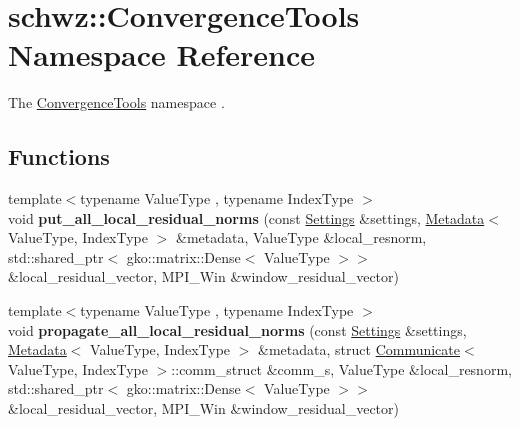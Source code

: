 \hypertarget{namespaceschwz_1_1ConvergenceTools}{}\section{schwz\+:\+:Convergence\+Tools Namespace Reference}
\label{namespaceschwz_1_1ConvergenceTools}


The \hyperlink{namespaceschwz_1_1ConvergenceTools}{Convergence\+Tools} namespace .  


\subsection*{Functions}
\begin{DoxyCompactItemize}
\item 
\mbox{\label{namespaceschwz_1_1ConvergenceTools_a1d13618d05716b2163c37dce8a60ef45}} 
{\footnotesize template$<$typename Value\+Type , typename Index\+Type $>$ }\\void {\bfseries put\+\_\+all\+\_\+local\+\_\+residual\+\_\+norms} (const \hyperlink{structschwz_1_1Settings}{Settings} \&settings, \hyperlink{structschwz_1_1Metadata}{Metadata}$<$ Value\+Type, Index\+Type $>$ \&metadata, Value\+Type \&local\+\_\+resnorm, std\+::shared\+\_\+ptr$<$ gko\+::matrix\+::\+Dense$<$ Value\+Type $>$$>$ \&local\+\_\+residual\+\_\+vector, M\+P\+I\+\_\+\+Win \&window\+\_\+residual\+\_\+vector)
\item 
\mbox{\label{namespaceschwz_1_1ConvergenceTools_acebb748c8b281d6df3a99ebd9cc3e779}} 
{\footnotesize template$<$typename Value\+Type , typename Index\+Type $>$ }\\void {\bfseries propagate\+\_\+all\+\_\+local\+\_\+residual\+\_\+norms} (const \hyperlink{structschwz_1_1Settings}{Settings} \&settings, \hyperlink{structschwz_1_1Metadata}{Metadata}$<$ Value\+Type, Index\+Type $>$ \&metadata, struct \hyperlink{classschwz_1_1Communicate}{Communicate}$<$ Value\+Type, Index\+Type $>$\+::comm\+\_\+struct \&comm\+\_\+s, Value\+Type \&local\+\_\+resnorm, std\+::shared\+\_\+ptr$<$ gko\+::matrix\+::\+Dense$<$ Value\+Type $>$$>$ \&local\+\_\+residual\+\_\+vector, M\+P\+I\+\_\+\+Win \&window\+\_\+residual\+\_\+vector)
\item 
\mbox{\label{namespaceschwz_1_1ConvergenceTools_adecfde64c11a5a00f0e254df8cbd093b}} 

\end{DoxyCompactItemize}
